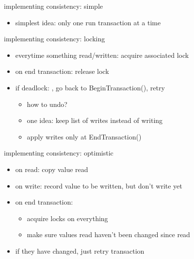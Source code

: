 \begin{frame}{implementing consistency: simple}
    \begin{itemize}
    \item simplest idea: only one run transaction at a time
    \end{itemize}
\end{frame}

\begin{frame}{implementing consistency: locking}
    \begin{itemize}
    \item everytime something read/written: acquire associated lock
    \item on end transaction: release lock
    \vspace{.5cm}
    \item if deadlock: , go back to BeginTransaction(), retry
        \begin{itemize}
        \item how to undo?
        \item one idea: keep list of writes instead of writing
        \item apply writes only at EndTransaction()
        \end{itemize}
    \end{itemize}
\end{frame}

\begin{frame}{implementing consistency: optimistic}
    \begin{itemize}
    \item on read: copy value read
    \item on write: record value to be written, but don't write yet
    \item on end transaction: 
        \begin{itemize}
        \item acquire locks on everything
        \item make sure values read haven't been changed since read
        \end{itemize}
    \vspace{.5cm}
    \item if they have changed, just retry transaction
    \end{itemize}
\end{frame}


